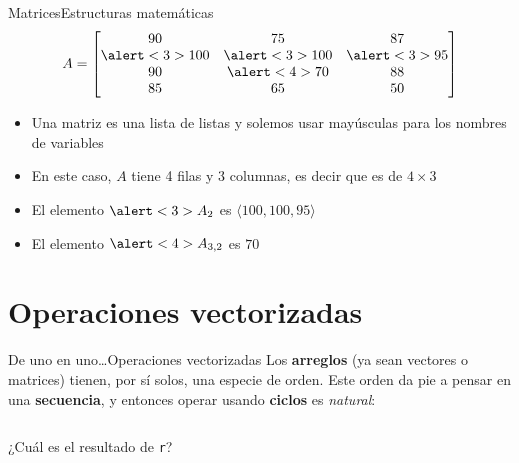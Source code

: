 \documentclass[spanish, c]{beamer}
\begin{document}
\begin{frame}{Matrices}{Estructuras matemáticas}
    $$A = 
    \begin{bmatrix}
        90 & 75 & 87 \\
        \alert<3>{100} & \alert<3>{100} & \alert<3>{95} \\
        90 & \alert<4>{70} & 88 \\
        85 & 65 & 50
    \end{bmatrix}
    $$

    \bigskip

    \begin{itemize}[<+->]
        \item Una \alert{matriz} es una lista de listas y solemos usar mayúsculas para los nombres de variables
        \item En este caso, $A$ tiene 4 filas y 3 columnas, es decir que es de $4 \times 3$
        \item El elemento $\alert<3>{A_2}$ es $\langle 100, 100, 95 \rangle$
        \item El elemento $\alert<4>{A_{3,2}}$ es $70$
    \end{itemize}

\end{frame}

\section{Operaciones vectorizadas}

\begin{frame}[fragile]{De uno en uno\dots}{Operaciones vectorizadas}
    Los \textbf{arreglos} (ya sean vectores o matrices) tienen, por sí solos, una especie de orden.
    Este orden da pie a pensar en una \textbf{secuencia}, y entonces operar usando \textbf{ciclos} es \textit{natural}:

    \bigskip

    \begin{columns}
        \begin{column}{0.95\linewidth}
            
        \end{column}
    \end{columns}

    \bigskip

    ¿Cuál es el resultado de \texttt{r}?
\end{frame}
\end{document}
